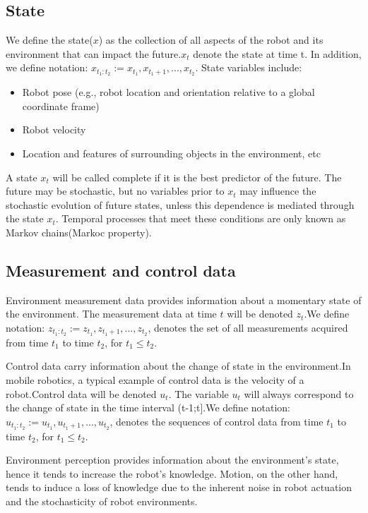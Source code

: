 \documentclass[twoside]{article}
\begin{document}
\subsection{State}
We define the state($x$) as the collection of all aspects
of the robot and its environment that can impact the future.$x_{t}$ denote the state at time t. In addition, we define notation: $x_{t_1:t_2} := x_{t_1},x_{t_1+1},...,x_{t_2}$. 
State variables include:
\begin{itemize}
  \item Robot	pose	(e.g.,	robot	location	and	orientation relative to a
global coordinate frame)
  \item Robot	velocity
  \item Location	and	features	of	surrounding	objects	in	the	environment,	etc
\end{itemize}

A state $x_{t}$ will be called complete if it is the best predictor of the future. The future may be stochastic, but no variables prior to $x_{t}$ may influence the stochastic evolution of future states, unless this dependence is mediated through the state $x_{t}$. Temporal processes that meet these conditions are only known as Markov chains(Markoc property).

\subsection{Measurement and control data}
Environment measurement data provides information about a momentary state of the environment. The measurement data at time $t$ will be denoted $z_{t}$.We define notation: $z_{t_1:t_2} := z_{t_1},z_{t_1+1},...,z_{t_2}$, denotes the set of all measurements acquired from time $t_1$ to time $t_2$, for
$t_1 \leq t_2$.\par

Control data carry information about the change of state in the environment.In mobile robotics, a typical example of control data is the velocity
of a robot.Control data will be denoted $u_t$. The variable $u_t$ will always correspond to
the change of state in the time interval (t-1;t].We define notation: $u_{t_1:t_2} := u_{t_1},u_{t_1+1},...,u_{t_2}$, denotes the sequences of control data from time $t_1$ to time $t_2$, for
$t_1 \leq t_2$.\par

 Environment perception provides information about the environment’s state, hence it tends to increase the robot’s knowledge. Motion, on  the other hand, tends to induce a loss of knowledge due to the inherent noise in robot actuation and the stochasticity of robot environments.
 
\end{document}
